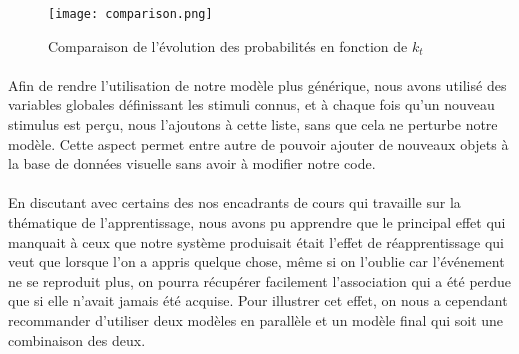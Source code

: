 \begin{figure}[H]
  \caption{Comparaison de l'évolution des probabilités en fonction de $k_t$}
  \texttt{[image: comparison.png]}
\end{figure}

\paragraph{}
Afin de rendre l'utilisation de notre modèle plus générique, nous avons utilisé
des variables globales définissant les stimuli connus, et à chaque fois qu'un
nouveau stimulus est perçu, nous l'ajoutons à cette liste, sans que cela ne
perturbe notre modèle. Cette aspect permet entre autre de pouvoir ajouter de
nouveaux objets à la base de données visuelle sans avoir à modifier notre code.

\paragraph{}
En discutant avec certains des nos encadrants de cours qui travaille sur la
thématique de l'apprentissage, nous avons pu apprendre que le principal effet
qui manquait à ceux que notre système produisait était l'effet de
réapprentissage qui veut que lorsque l'on a appris quelque chose, même si on
l'oublie car l'événement ne se reproduit plus, on pourra récupérer facilement
l'association qui a été perdue que si elle n'avait jamais été acquise. Pour
illustrer cet effet, on nous a cependant recommander d'utiliser deux modèles en
parallèle et un modèle final qui soit une combinaison des deux.
